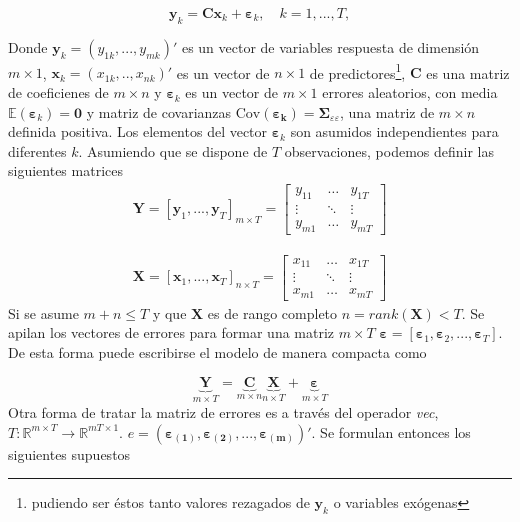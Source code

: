 \documentclass[12pt, twoside]{book}\usepackage[]{graphicx}\usepackage[]{color}
\let\bold\boldsymbol
\let\bf\mathbf
\numberwithin{equation}{section}
\numberwithin{theorem}{section}
\numberwithin{teorema}{section}
\numberwithin{defi}{section}
\numberwithin{prop}{section}
\numberwithin{defi}{section}
\theoremstyle{plain}
\begin{document}
\begin{equation}\label{MLS}
\bf{y}_{k} = \bf{C}\bf{x}_{k}+\boldsymbol{\varepsilon}_{k}, \quad k=1,...,T, 
\end{equation}

Donde $\bf{y}_{k}= (y_{1k},...,y_{mk})'$ es un vector de variables respuesta de dimensión $m\times 1$, $\bf{x}_{k}=(x_{1k},..,x_{nk})'$ es un vector de $n\times 1$ de predictores\footnote{pudiendo ser éstos tanto valores rezagados de $\bf{y}_{k}$ o variables exógenas}, $\bf{C}$ es una matriz de coeficienes de $m\times n$ y $\boldsymbol{\varepsilon}_{k}$ es un vector de $m\times 1$ errores aleatorios, con media $\mathbb{E}(\boldsymbol{\varepsilon}_{k})=\bf{0}$ y matriz de covarianzas $\text{Cov}(\boldsymbol{\varepsilon_{k}})=\bold{\Sigma}_{\varepsilon\varepsilon}$, una matriz de $m\times n$ definida positiva. Los elementos del vector $\boldsymbol{\varepsilon}_{k}$ son asumidos independientes para diferentes $k$. Asumiendo que se dispone de $T$ observaciones, podemos definir las siguientes matrices 
\begin{align}
\bf{Y} = \left[\bf{y}_{1},...,\bf{y}_{T} \right]_{m\times T} = \left[
\begin{array}{ccc} 
y_{11} & \hdots & y_{1T} \\ 
\vdots & \ddots & \vdots \\ 
y_{m1} & \hdots & y_{mT}
\end{array}\right] 
\end{align}

\begin{align}
\bf{X} = \left[\bf{x}_{1},...,\bf{x}_{T} \right]_{n\times T} = \left[
\begin{array}{ccc} 
x_{11} & \hdots & x_{1T} \\ 
\vdots & \ddots & \vdots \\ 
x_{m1} & \hdots & x_{mT}
\end{array}\right] 
\end{align}
Si se asume $m+n\leq T$ y que $\bf{X}$ es de rango completo $n=rank(\bf{X})<T$. Se apilan los vectores de errores para formar una matriz $m\times T$ 
$\boldsymbol{\varepsilon} = [\boldsymbol{\varepsilon}_{1},\boldsymbol{\varepsilon}_{2},...,\boldsymbol{\varepsilon}_{T}]$. De esta forma puede escribirse el modelo de manera compacta como

\begin{equation}
\underbrace{\bf{Y}}_{m\times T}=\underbrace{\bf{C}}_{m\times n}\underbrace{\bf{X}}_{n\times T}+\underbrace{\boldsymbol{\varepsilon}}_{m\times T}
\end{equation}
Otra forma de tratar la matriz de errores es a través del operador \textit{vec}, $T: \mathbb{R}^{m\times T}\rightarrow \mathbb{R}^{mT\times 1}$.
$e = (\boldsymbol{\varepsilon_{(1)}}, \boldsymbol{\varepsilon_{(2)}}, ..., \boldsymbol{\varepsilon_{(m)}})'$. Se formulan entonces los siguientes supuestos 
\end{document}
